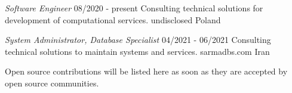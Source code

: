 \documentclass[a4paper,12pt]{memoir} %
\begin{document}



{\textit{Software Engineer}}
{08/2020 - present}
{Consulting technical solutions for development of computational services.}
{undisclosed}
{Poland}


{\textit{System Administrator, Database Specialist}}
{04/2021 - 06/2021}
{Consulting technical solutions to maintain systems and services.}
{sarmadbs.com}
{Iran}


\Sep %




Open source contributions will be listed here as soon as they are accepted by open source communities.


\Sep %


\clearpage %

\userinformation %

\framebreak %
\end{document}
